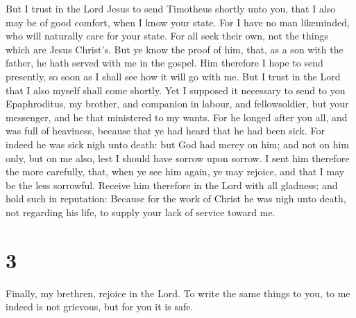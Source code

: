  But I trust in the Lord Jesus to send Timotheus shortly
unto you, that I also may be of good comfort, when I know your state.
 For I have no man likeminded, who will naturally care
for your state.  For all seek their own, not the things
which are Jesus Christ's.  But ye know the proof of him,
that, as a son with the father, he hath served with me in the gospel.
 Him therefore I hope to send presently, so soon as I
shall see how it will go with me.  But I trust in the
Lord that I also myself shall come shortly.  Yet I
supposed it necessary to send to you Epaphroditus, my brother, and
companion in labour, and fellowsoldier, but your messenger, and he that
ministered to my wants.  For he longed after you all, and
was full of heaviness, because that ye had heard that he had been sick.
 For indeed he was sick nigh unto death: but God had
mercy on him; and not on him only, but on me also, lest I should have
sorrow upon sorrow.  I sent him therefore the more
carefully, that, when ye see him again, ye may rejoice, and that I may
be the less sorrowful.  Receive him therefore in the Lord
with all gladness; and hold such in reputation:  Because
for the work of Christ he was nigh unto death, not regarding his life,
to supply your lack of service toward me.

\hypertarget{section-2}{%
\section{3}\label{section-2}}

 Finally, my brethren, rejoice in the Lord. To write the
same things to you, to me indeed is not grievous, but for you it is
safe.

